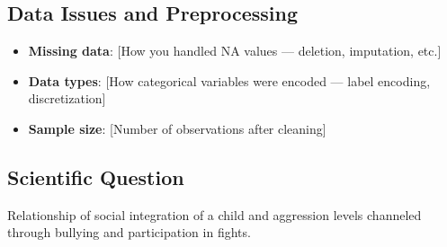 \documentclass[a4paper]{article}
\begin{document}
\subsection{Data Issues and Preprocessing}
\begin{itemize}
    \item \textbf{Missing data}: [How you handled NA values — deletion, imputation, etc.]
    \item \textbf{Data types}: [How categorical variables were encoded — label encoding, discretization]
    \item \textbf{Sample size}: [Number of observations after cleaning]
\end{itemize}

\subsection{Scientific Question}
Relationship of social integration of a child and aggression levels channeled through bullying and participation in fights.  
\end{document}
